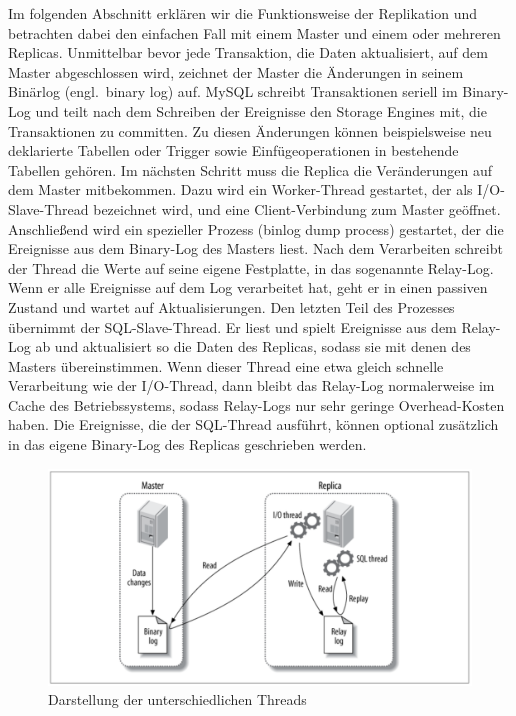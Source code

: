 Im folgenden Abschnitt erklären wir die Funktionsweise der Replikation und betrachten dabei den einfachen Fall mit einem Master und einem oder mehreren Replicas.
Unmittelbar bevor jede Transaktion, die Daten aktualisiert, auf dem Master abgeschlossen wird, zeichnet der Master die Änderungen in seinem Binärlog (engl.\ binary log) auf.
MySQL schreibt Transaktionen seriell im Binary-Log und teilt nach dem Schreiben der Ereignisse den Storage Engines mit, die Transaktionen zu committen.
Zu diesen Änderungen können beispielsweise neu deklarierte Tabellen oder Trigger sowie Einfügeoperationen in bestehende Tabellen gehören.
Im nächsten Schritt muss die Replica die Veränderungen auf dem Master mitbekommen.
Dazu wird ein Worker-Thread gestartet, der als I/O-Slave-Thread bezeichnet wird, und eine Client-Verbindung zum Master geöffnet.
Anschließend wird ein spezieller Prozess (binlog dump process) gestartet, der die Ereignisse aus dem Binary-Log des Masters liest.
Nach dem Verarbeiten schreibt der Thread die Werte auf seine eigene Festplatte, in das sogenannte Relay-Log.
Wenn er alle Ereignisse auf dem Log verarbeitet hat, geht er in einen passiven Zustand und wartet auf Aktualisierungen.
Den letzten Teil des Prozesses übernimmt der SQL-Slave-Thread.
Er liest und spielt Ereignisse aus dem Relay-Log ab und aktualisiert so die Daten des Replicas, sodass sie mit denen des Masters übereinstimmen.
Wenn dieser Thread eine etwa gleich schnelle Verarbeitung wie der I/O-Thread, dann bleibt das Relay-Log normalerweise im Cache des Betriebssystems, sodass Relay-Logs nur sehr geringe Overhead-Kosten haben.
Die Ereignisse, die der SQL-Thread ausführt, können optional zusätzlich in das eigene Binary-Log des Replicas geschrieben werden.

\begin{figure}[!ht]
  \centering
  \includegraphics[width=.8\textwidth]{PNGs/Textbook/Master_Replica}
  \caption[Master - Replica - Grafik]{Darstellung der unterschiedlichen Threads}
  \label{fig:master-replica}
\end{figure}

